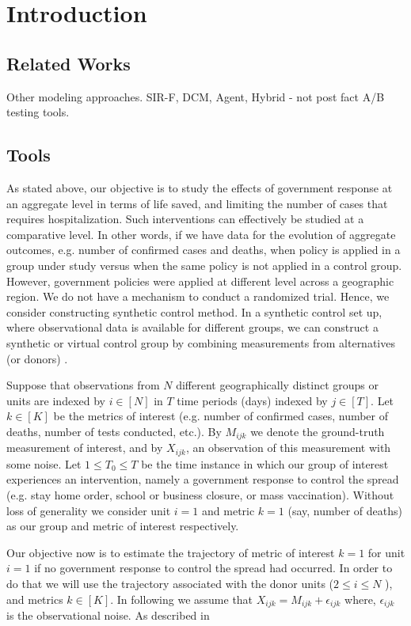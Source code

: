 \documentclass[12pt]{article}
\begin{document}
		\section{Introduction}
			\subsection{Related Works}
		Other modeling approaches. SIR-F, DCM, Agent, Hybrid - not post fact A/B testing tools.
		
		\subsection{Tools}
		As stated above, our objective is to study the effects of government response at an aggregate level in terms of life saved, and limiting the number of cases that requires hospitalization. Such interventions can effectively be studied at a comparative level. In other words, if we have data for the evolution of aggregate outcomes, e.g. number of confirmed cases and deaths, when policy is applied in a group under study versus when the same policy is not applied in a control group. However, government policies were applied at different level across a geographic region.  We do not have a mechanism to conduct a randomized trial. Hence, we consider constructing synthetic control method\cite{ap08746, JMLR18}. In a synthetic control set up, where observational data is available for different groups, we can construct a synthetic or virtual control group by combining measurements from alternatives (or donors) .\par
		
		Suppose that observations from $N$ different geographically distinct groups or units are indexed by $i \in [N]$ in $T$ time periods (days) indexed by $j \in [T]$. Let $k \in [K]$ be the metrics of interest (e.g. number of confirmed cases, number of deaths, number of tests conducted, etc.). By $M_{ijk}$ we denote the ground-truth measurement of interest, and by $X_{ijk}$, an observation of this measurement with some noise. Let $1 \leq T_0 \leq T$ be the time instance in which our group of interest experiences an intervention, namely a government response to control the spread (e.g. stay home order, school or business closure, or mass vaccination). Without loss of generality we consider unit $i = 1$ and metric $k = 1$ (say, number of deaths) as our group and metric of interest respectively.
		
		Our objective now is to estimate the trajectory of metric of interest $k = 1$  for unit $i = 1$ if no government response to control the spread had occurred. In order to do that we will use the trajectory associated with the donor units ($2 \leq i \leq N$ ), and metrics $k \in [K ]$. In following we assume that $X_{ijk} = M_{ijk} + \epsilon_{ijk}$ where, $\epsilon_{ijk}$ is the observational noise. As described in \cite{AMSS10}
		
\end{document}
